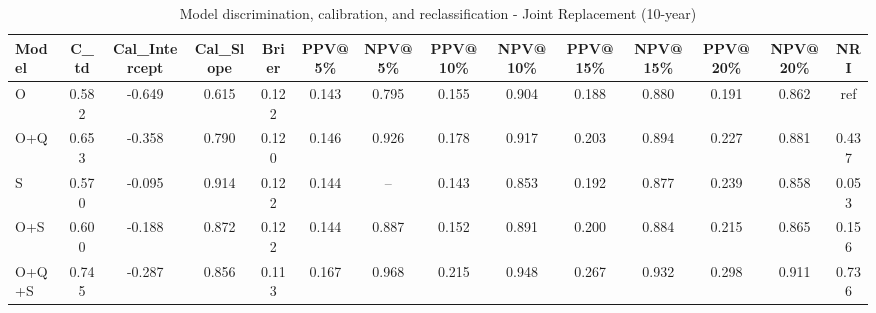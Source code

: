 \begin{table}[htbp]
\centering
\small
\caption{Model discrimination, calibration, and reclassification - Joint Replacement (10-year)}
\label{tab:perf_joint_10y}
\begin{tabular}{lccccccccccccc}
\toprule
Model & C\_td & Cal\_Intercept & Cal\_Slope & Brier & PPV@5\% & NPV@5\% & PPV@10\% & NPV@10\% & PPV@15\% & NPV@15\% & PPV@20\% & NPV@20\% & NRI \\
\midrule
O & 0.582 & -0.649 & 0.615 & 0.122 & 0.143 & 0.795 & 0.155 & 0.904 & 0.188 & 0.880 & 0.191 & 0.862 & ref \\
O+Q & 0.653 & -0.358 & 0.790 & 0.120 & 0.146 & 0.926 & 0.178 & 0.917 & 0.203 & 0.894 & 0.227 & 0.881 & 0.437 \\
S & 0.570 & -0.095 & 0.914 & 0.122 & 0.144 & -- & 0.143 & 0.853 & 0.192 & 0.877 & 0.239 & 0.858 & 0.053 \\
O+S & 0.600 & -0.188 & 0.872 & 0.122 & 0.144 & 0.887 & 0.152 & 0.891 & 0.200 & 0.884 & 0.215 & 0.865 & 0.156 \\
O+Q+S & 0.745 & -0.287 & 0.856 & 0.113 & 0.167 & 0.968 & 0.215 & 0.948 & 0.267 & 0.932 & 0.298 & 0.911 & 0.736 \\
\bottomrule
\end{tabular}
\end{table}